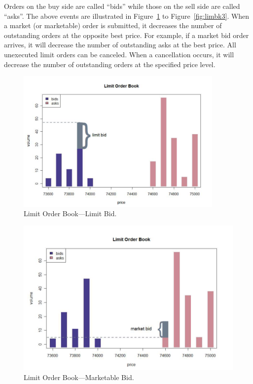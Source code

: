 Orders on the buy side are called ``bids'' while those on the sell side are called ``asks''. The above events are illustrated in Figure~\ref{fig:limbk1} to Figure~\ref{fig:limbk3}. When a market (or marketable) order is submitted, it decreases the number of outstanding orders at the opposite best price. For example, if a market bid order arrives, it will decrease the number of outstanding asks at the best price. All unexecuted limit orders can be canceled. When a cancellation occurs, it will decrease the number of outstanding orders at the specified price level.
	\begin{figure}[!ht]
	   \centering
	   \includegraphics[width=0.9\textwidth]{chapters/chapter_trading_fund/figures/limitbk1.png} 
	   \caption{Limit Order Book---Limit Bid. \label{fig:limbk1}}
	\end{figure}
	
	\begin{figure}[!ht]
	   \centering
	   \includegraphics[width=\textwidth]{chapters/chapter_trading_fund/figures/limitbk2.png} 
	   \caption{Limit Order Book---Marketable Bid. \label{fig:limbk2}}
	\end{figure}
	
